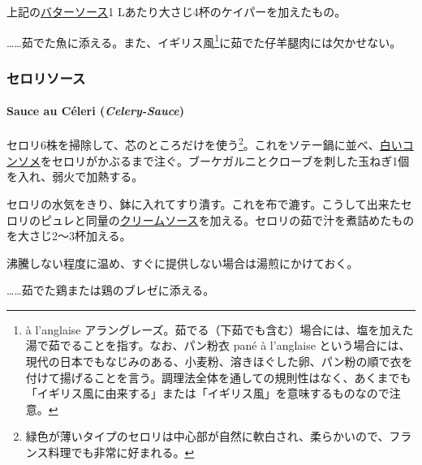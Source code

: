 \begin{recette}
上記の\protect\hyperlink{butter-sauce}{バターソース}1
Lあたり大さじ4杯のケイパーを加えたもの。

\ldots{}\ldots{}茹でた魚に添える。また、イギリス風\footnote{à l'anglaise
  アラングレーズ。茹でる（下茹でも含む）場合には、塩を加えた湯で茹でることを指す。なお、パン粉衣
  pané à l'anglaise
  という場合には、現代の日本でもなじみのある、小麦粉、溶きほぐした卵、パン粉の順で衣を付けて揚げることを言う。調理法全体を通しての規則性はなく、あくまでも「イギリス風に由来する」または「イギリス風」を意味するものなので注意。}に茹でた仔羊腿肉には欠かせない。

\maeaki

\hypertarget{ux30bbux30edux30eaux30bdux30fcux30b9}{%
\subsubsection{セロリソース}\label{ux30bbux30edux30eaux30bdux30fcux30b9}}

\hypertarget{celery-sauce}{%
\paragraph{\texorpdfstring{Sauce au Céleri
(\emph{Celery-Sauce})}{Sauce au Céleri (Celery-Sauce)}}\label{celery-sauce}}


セロリ6株を掃除して、芯のところだけを使う\footnote{緑色が薄いタイプのセロリは中心部が自然に軟白され、柔らかいので、フランス料理でも非常に好まれる。}。これをソテー鍋に並べ、\protect\hyperlink{}{白いコンソメ}をセロリがかぶるまで注ぐ。ブーケガルニとクローブを刺した玉ねぎ1個を入れ、弱火で加熱する。

セロリの水気をきり、鉢に入れてすり潰す。これを布で漉す。こうして出来たセロリのピュレと同量の\protect\hyperlink{cream-sauce}{クリームソース}を加える。セロリの茹で汁を煮詰めたものを大さじ2〜3杯加える。

沸騰しない程度に温め、すぐに提供しない場合は湯煎にかけておく。

\ldots{}\ldots{}茹でた鶏または鶏のブレゼに添える。


\end{recette}
